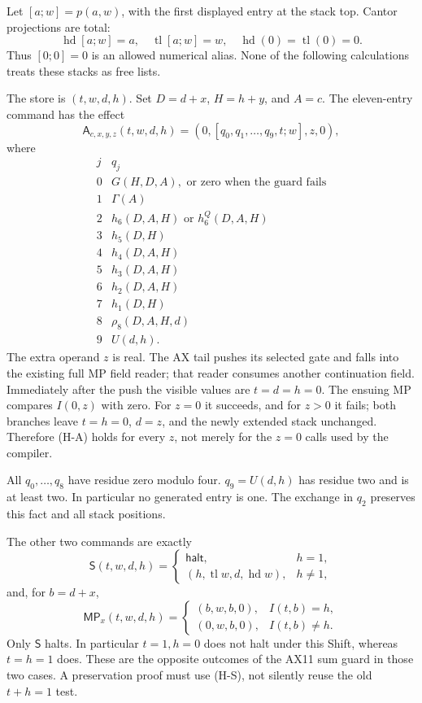 Let $[a;w]=p(a,w)$, with the first displayed entry at the stack top.
Cantor projections are total:
\[
 \operatorname{hd}[a;w]=a,\quad
 \operatorname{tl}[a;w]=w,\quad
 \operatorname{hd}(0)=\operatorname{tl}(0)=0.
\]
Thus $[0;0]=0$ is an allowed numerical alias. None of the following
calculations treats these stacks as free lists.

The store is $(t,w,d,h)$. Set $D=d+x$, $H=h+y$, and $A=c$. The
eleven-entry command has the effect
\[
 \mathsf A_{c,x,y,z}(t,w,d,h)
   =(0,[q_0,q_1,\ldots,q_9,t;w],z,0),                  \tag{H-A}
\]
where
\[
\begin{array}{c|l}
 j&q_j\\\hline
 0&G(H,D,A),\text{ or zero when the guard fails}\\
 1&\Gamma(A)\\
 2&h_6(D,A,H)\text{ or }h_6^Q(D,A,H)\\
 3&h_5(D,H)\\
 4&h_4(D,A,H)\\
 5&h_3(D,A,H)\\
 6&h_2(D,A,H)\\
 7&h_1(D,H)\\
 8&\rho_8(D,A,H,d)\\
 9&U(d,h).
\end{array}
\]
The extra operand $z$ is real. The AX tail pushes its selected gate and
falls into the existing full MP field reader; that reader consumes
another continuation field. Immediately after the push the visible
values are $t=d=h=0$. The ensuing MP compares $I(0,z)$ with zero.
For $z=0$ it succeeds, and for $z>0$ it fails; both branches leave
$t=h=0$, $d=z$, and the newly extended stack unchanged. Therefore (H-A)
holds for every $z$, not merely for the $z=0$ calls used by the compiler.

All $q_0,\ldots,q_8$ have residue zero modulo four.
$q_9=U(d,h)$ has residue two and is at least two. In particular no
generated entry is one. The exchange in $q_2$ preserves this fact and
all stack positions.

The other two commands are exactly
\[
 \mathsf S(t,w,d,h)=
 \begin{cases}
  \mathsf{halt},&h=1,\\
  (h,\operatorname{tl}w,d,\operatorname{hd}w),&h\ne1,
 \end{cases}                                             \tag{H-S}
\]
and, for $b=d+x$,
\[
 \mathsf{MP}_x(t,w,d,h)=
 \begin{cases}
  (b,w,b,0),&I(t,b)=h,\\
  (0,w,b,0),&I(t,b)\ne h.
 \end{cases}                                             \tag{H-M}
\]
Only $\mathsf S$ halts. In particular $t=1,h=0$ does not halt under
this Shift, whereas $t=h=1$ does. These are the opposite outcomes of
the AX11 sum guard in those two cases. A preservation proof must use
(H-S), not silently reuse the old $t+h=1$ test.

